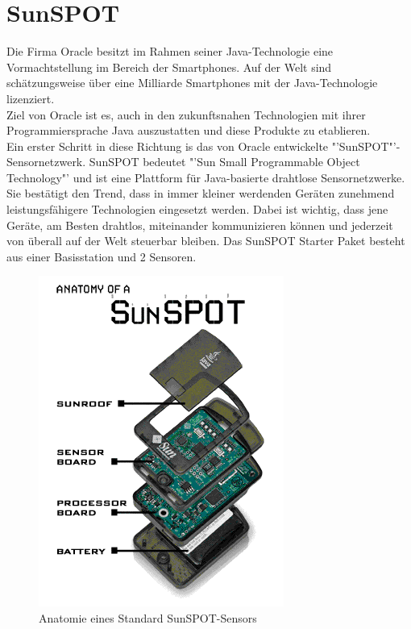 \section{SunSPOT}\label{s:Sunspot}

Die Firma Oracle besitzt im Rahmen seiner Java-Technologie eine Vormachtstellung im Bereich der Smartphones.
Auf der Welt sind schätzungsweise über eine Milliarde Smartphones mit der Java-Technologie lizenziert. \cite{d:horan} \\ Ziel von Oracle ist es, auch in den zukunftsnahen Technologien mit ihrer Programmiersprache Java auszustatten und diese Produkte zu etablieren.\\

Ein erster Schritt in diese Richtung is das von Oracle entwickelte "'SunSPOT"'-Sensornetzwerk. SunSPOT bedeutet "'Sun Small Programmable Object Technology"' und ist eine Plattform für Java-basierte drahtlose Sensornetzwerke. Sie bestätigt den Trend, dass in immer kleiner werdenden Geräten zunehmend leistungsfähigere Technologien eingesetzt werden. Dabei ist wichtig, dass jene Geräte, am Besten drahtlos, miteinander kommunizieren können und jederzeit von überall auf der Welt steuerbar bleiben. Das SunSPOT Starter Paket besteht aus einer Basisstation und 2 Sensoren. \\

\begin{figure}[H] 
	\centering
	\includegraphics[scale=0.5]{Bilder/spotanatomy}
	\caption{Anatomie eines Standard SunSPOT-Sensors\cite{i:spotaufbau}}
	\label{f:spotaufbau}
\end{figure}

